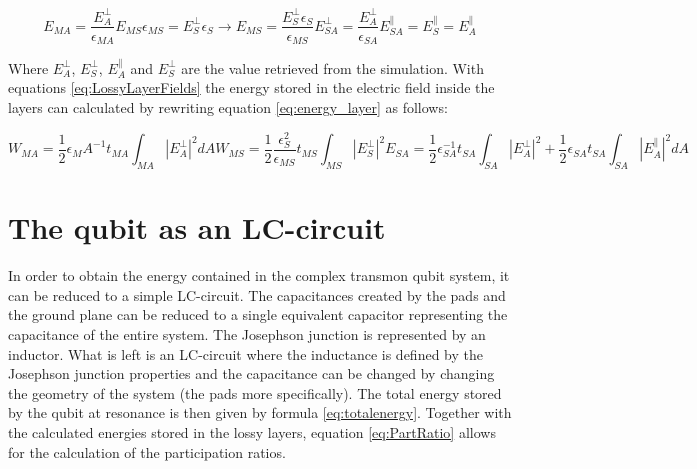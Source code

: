 \begin{subequations}\label{eq:LossyLayerFields}
	\begin{equation} \label{eq:LossyLayerFieldsA}
	E_{MA} =\frac{ E_{A}^{\bot}}{\epsilon_{MA}}
	\end{equation}	
	\begin{equation} \label{eq:LossyLayerFieldsB}
	E_{MS}\epsilon_{MS}=E_{S}^{\bot}\epsilon_{S} \rightarrow E_{MS}= \frac{E_{S}^{\bot}\epsilon_{S}}{\epsilon_{MS}}
	\end{equation}
	\begin{equation}\label{eq:LossyLayerFieldsC}
	E_{SA}^{\bot}=\frac{E_{A}^{\bot}}{\epsilon_{SA}}
	\end{equation}
	\begin{equation}\label{eq:LossyLayerFieldsD}
	E_{SA}^{\parallel}=E_{S}^{\parallel}=E_{A}^{\parallel}
	\end{equation}
\end{subequations}

Where \(E_{A}^{\bot}\), \(E_{S}^{\bot}\), \(E_{A}^{\parallel}\) and \(E_{S}^{\bot}\) are the value retrieved from the simulation. With equations \eqref{eq:LossyLayerFields} the energy stored in the electric field inside the layers can calculated by rewriting equation \eqref{eq:energy_layer} as follows:

\begin{subequations}\label{eq:LossyLayerEnergy}
	\begin{equation} \label{eq:LossyLayerEnergyA}
	W_{MA} =\frac{1}{2}\epsilon_MA^{-1}t_{MA}\int_{MA}^{}|E_{A}^{\bot}|^{2}dA
	\end{equation}	
	\begin{equation} \label{eq:LossyLayerEnergyB}
	W_{MS} = \frac{1}{2}\frac{\epsilon_{S}^{2}}{\epsilon_{MS}}t_{MS}\int_{MS}^{}|E_{S}^{\bot}|^{2} 
	\end{equation}
	\begin{equation}\label{eq:LossyLayerEnergyC}
	E_{SA} = \frac{1}{2}\epsilon_{SA}^{-1}t_{SA}\int_{SA}^{}|E_{A}^{\bot}|^{2} +\frac{1}{2} \epsilon_{SA}t_{SA}\int_{SA}^{}|E_{A}^{\parallel}|^{2}dA
	\end{equation}
\end{subequations}

\section{The qubit as an LC-circuit}
In order to obtain the energy contained in the complex transmon qubit system, it can be reduced to a simple LC-circuit. The capacitances created by the pads and the ground plane can be reduced to a single equivalent capacitor representing the capacitance of the entire system. The Josephson junction is represented by an inductor. What is left is an LC-circuit where the inductance is defined by the Josephson junction properties and the capacitance can be changed by changing the geometry of the system (the pads more specifically). The total energy stored by the qubit at resonance is then given by formula \eqref{eq:totalenergy}. Together with the calculated energies stored in the lossy layers, equation \eqref{eq:PartRatio} allows for the calculation of the participation ratios.

